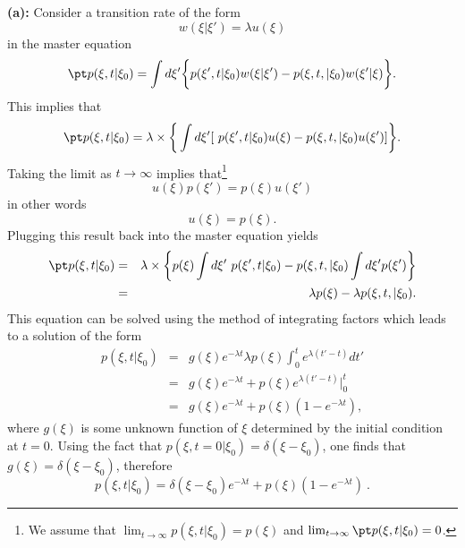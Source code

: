 

\textbf{(a):} 
Consider a transition rate of the form 
\begin{equation}
w(\xi|\xi') = \lambda u(\xi) \label{eq:kubo_anderson_rate}
\end{equation} 
in the master equation
\begin{equation}
\pt p(\xi, t | \xi_0) = \int d\xi' \bigg\{ p(\xi', t | \xi_0) w(\xi|\xi') -  p(\xi, t, |\xi_0) w(\xi'|\xi) \bigg\}. \nonumber
\end{equation}
This implies that
\begin{equation}
\pt p(\xi, t | \xi_0) = \lambda \times \bigg\{ \int d \xi' [~p(\xi', t | \xi_0) u(\xi) - p(\xi, t, |\xi_0) u(\xi') ]\bigg\}. \label{eq:kubo_anderson_master}
\end{equation}
Taking the limit as $t\rightarrow\infty$ implies that\footnote{We assume that $\lim_{t\rightarrow\infty} p(\xi, t | \xi_0) = p(\xi)$ and $\lim_{t\rightarrow\infty} \pt p(\xi, t | \xi_0) = 0$.}
\begin{equation}
u(\xi) p(\xi') = p(\xi) u(\xi')
\end{equation}  
in other words 
\begin{equation}
u(\xi) = p(\xi).
\end{equation}
Plugging this result back into the master equation yields
\begin{eqnarray}
\pt p(\xi, t | \xi_0) &=& \lambda \times \bigg\{ p(\xi) \int d \xi' ~p(\xi', t | \xi_0) - p(\xi, t, |\xi_0) \int d \xi' p(\xi')  \bigg\} \\
&=&  \lambda p(\xi) - \lambda p(\xi, t, |\xi_0).
\end{eqnarray}
This equation can be solved using the method of integrating factors which leads to a solution of the form
\begin{eqnarray}
p(\xi, t | \xi_0) &=& g(\xi) e^{-\lambda t} \lambda p(\xi) \int_{0}^{t} e^{\lambda(t'-t)} dt'  \nonumber \\
&=& g(\xi) e^{-\lambda t} + p(\xi) e^{\lambda(t'-t)} \bigg|^{t}_{0} \nonumber \\
&=& g(\xi) e^{-\lambda t} + p(\xi) (1-e^{-\lambda t}),
\end{eqnarray}
where $g(\xi)$ is some unknown function of $\xi$ determined by the initial condition at $t=0$. Using the fact that $p(\xi,t=0|\xi_0) = \delta(\xi-\xi_0)$, one finds that $g(\xi) = \delta(\xi-\xi_0)$, therefore
\begin{equation}
\boxed{p(\xi, t | \xi_0)  = \delta(\xi-\xi_0) e^{-\lambda t} + p(\xi) (1-e^{-\lambda t})}~.
\end{equation}

